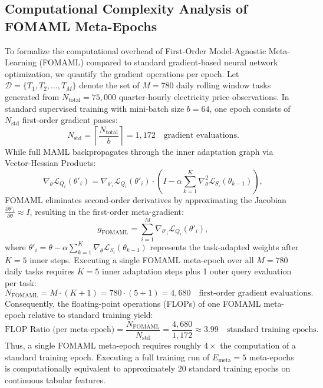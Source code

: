 \documentclass[preprint,12pt,nonatbib]{elsarticle}
\begin{document}
\subsection*{Computational Complexity Analysis of FOMAML Meta-Epochs}
To formalize the computational overhead of First-Order Model-Agnostic Meta-Learning (FOMAML) \citep{Finn.2017,Nichol.2018} compared to standard gradient-based neural network optimization, we quantify the gradient operations per epoch. 
Let $\mathcal{D} = \{T_1, T_2, \dots, T_M\}$ denote the set of $M = 780$ daily rolling window tasks generated from $N_{\text{total}} = 75,000$ quarter-hourly electricity price observations. In standard supervised training with mini-batch size $b = 64$, one epoch consists of $N_{\text{std}}$ first-order gradient passes:
\begin{equation}
    N_{\text{std}} = \left\lceil \frac{N_{\text{total}}}{b} \right\rceil = 1,172 \quad \text{gradient evaluations.}
\end{equation}
While full MAML backpropagates through the inner adaptation graph via Vector-Hessian Products:
\begin{equation}
    \nabla_{\theta} \mathcal{L}_{Q_i}(\theta'_i) = \nabla_{\theta'_i} \mathcal{L}_{Q_i}(\theta'_i) \cdot \left( I - \alpha \sum_{k=1}^{K} \nabla_{\theta}^2 \mathcal{L}_{S_i}(\theta_{k-1}) \right),
\end{equation}
FOMAML \cite{Finn.2017,Nichol.2018} eliminates second-order derivatives by approximating the Jacobian $\frac{\partial \theta'_i}{\partial \theta} \approx I$, resulting in the first-order meta-gradient:
\begin{equation}
    g_{\text{FOMAML}} = \sum_{i=1}^{M} \nabla_{\theta'_i} \mathcal{L}_{Q_i}(\theta'_i),
\end{equation}
where $\theta'_i = \theta - \alpha \sum_{k=1}^{K} \nabla_{\theta} \mathcal{L}_{S_i}(\theta_{k-1})$ represents the task-adapted weights after $K = 5$ inner steps.
Executing a single FOMAML meta-epoch over all $M = 780$ daily tasks requires $K = 5$ inner adaptation steps plus 1 outer query evaluation per task:
\begin{equation}
    N_{\text{FOMAML}} = M \cdot (K + 1) = 780 \cdot (5 + 1) = 4,680 \quad \text{first-order gradient evaluations.}
\end{equation}
Consequently, the floating-point operations (FLOPs) of one FOMAML meta-epoch relative to standard training yield:
\begin{equation}
    \text{FLOP Ratio (per meta-epoch)} = \frac{N_{\text{FOMAML}}}{N_{\text{std}}} = \frac{4,680}{1,172} \approx 3.99 \quad \text{standard training epochs.}
\end{equation}
Thus, a single FOMAML meta-epoch requires roughly $4\times$ the computation of a standard training epoch. Executing a full training run of $E_{\text{meta}} = 5$ meta-epochs is computationally equivalent to approximately $20$ standard training epochs on continuous tabular features.
\end{document}
